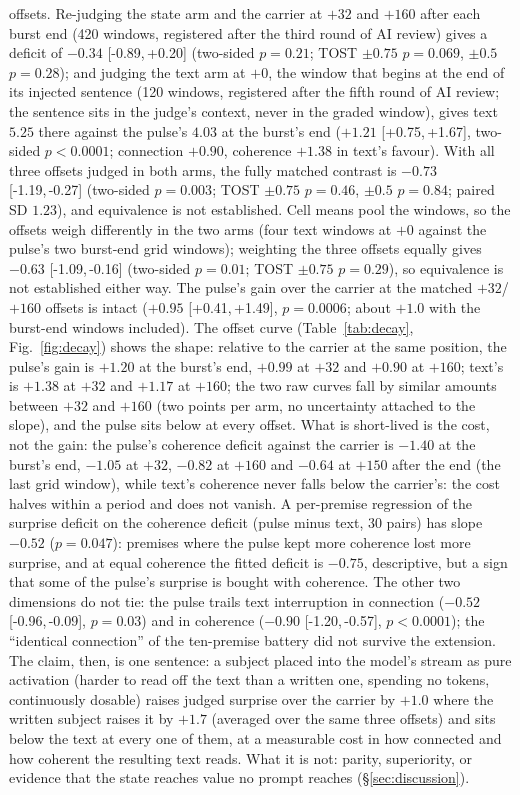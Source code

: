 \documentclass[11pt]{article}
\newcommand{\ci}[2]{[#1,\,#2]}
\begin{document}
offsets. Re-judging the state arm and the carrier at $+32$ and $+160$
after each burst end (420 windows, registered after the third round of
AI review) gives a deficit of $-0.34$ \ci{-0.89}{+0.20} (two-sided
$p=0.21$; TOST $\pm0.75$ $p=0.069$, $\pm0.5$ $p=0.28$); and judging
the text arm at $+0$, the window that begins at the end of its injected
sentence (120 windows, registered after the fifth round of AI review; the sentence
sits in the judge's context, never in the graded window), gives text
$5.25$ there against the pulse's $4.03$ at the burst's end
($+1.21$ \ci{+0.75}{+1.67}, two-sided $p<0.0001$; connection $+0.90$,
coherence $+1.38$ in text's favour). With all three
offsets judged in both arms, the fully matched contrast is $-0.73$
\ci{-1.19}{-0.27} (two-sided $p=0.003$; TOST $\pm0.75$
$p=0.46$, $\pm0.5$ $p=0.84$; paired SD $1.23$), and
equivalence is not established. Cell means pool the windows, so the
offsets weigh differently in the two arms (four text windows at $+0$
against the pulse's two burst-end grid windows); weighting the three
offsets equally gives $-0.63$ \ci{-1.09}{-0.16} (two-sided $p=0.01$;
TOST $\pm0.75$ $p=0.29$), so equivalence is not established either
way. The pulse's gain over the carrier at the matched $+32$/$+160$
offsets is intact ($+0.95$ \ci{+0.41}{+1.49}, $p=0.0006$; about $+1.0$
with the burst-end windows included).
The offset curve (Table~\ref{tab:decay}, Fig.~\ref{fig:decay}) shows
the shape: relative to the carrier at the same position, the pulse's
gain is $+1.20$ at the burst's end, $+0.99$ at $+32$ and $+0.90$ at
$+160$; text's is $+1.38$ at $+32$ and $+1.17$ at $+160$; the two raw
curves fall by similar amounts between $+32$ and $+160$ (two points per
arm, no uncertainty attached to the slope), and the pulse sits below at
every offset. What is short-lived is the cost, not the gain: the
pulse's coherence deficit against the carrier is $-1.40$ at the burst's
end, $-1.05$ at $+32$, $-0.82$ at $+160$ and $-0.64$ at $+150$ after
the end (the last grid window), while text's coherence never falls
below the carrier's: the cost halves within a period and does not
vanish. A per-premise regression of the surprise deficit on the
coherence deficit (pulse minus text, 30 pairs) has slope $-0.52$
($p=0.047$): premises where the pulse kept more coherence lost more
surprise, and at equal coherence the fitted deficit is $-0.75$,
descriptive, but a sign that some of the pulse's surprise is bought
with coherence. The other two dimensions do not tie: the pulse trails
text interruption in connection ($-0.52$ \ci{-0.96}{-0.09}, $p=0.03$)
and in coherence ($-0.90$ \ci{-1.20}{-0.57}, $p<0.0001$); the
``identical connection'' of the ten-premise battery did not survive the
extension. The claim, then, is one sentence: a subject placed into the
model's stream as pure activation (harder to read off the text than
a written one, spending no tokens, continuously dosable) raises
judged surprise over the carrier by $+1.0$ where the written subject
raises it by $+1.7$ (averaged over the same three offsets) and sits
below the text at every one of them, at a measurable cost
in how connected and how coherent the resulting text reads. What it is
not: parity, superiority, or evidence that the state reaches value no
prompt reaches (\S\ref{sec:discussion}).
\end{document}
